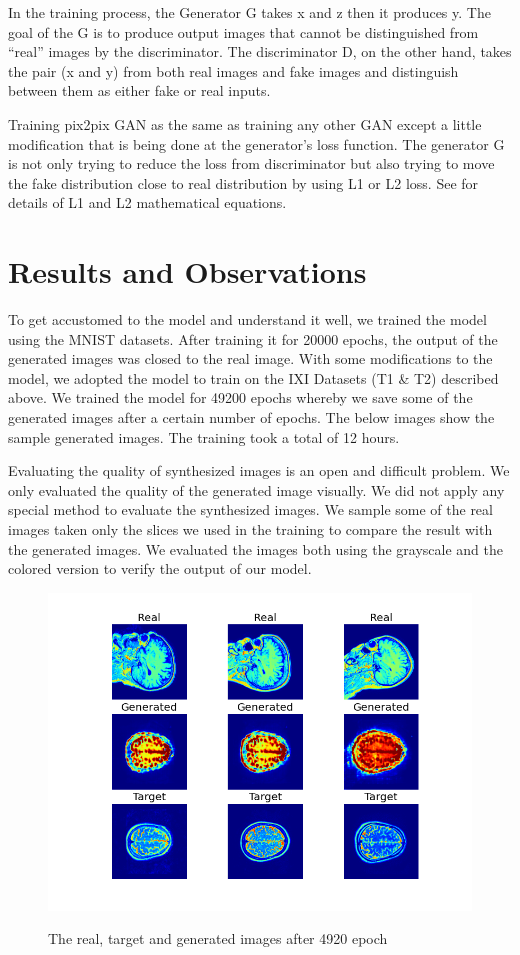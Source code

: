 \documentclass[conference]{IEEEtran}
\begin{document}
In the training process, the  Generator G takes x and z then it produces y. The goal of the G is to produce output images that cannot be distinguished from “real” images by the discriminator. The discriminator D, on the other hand, takes the pair (x and y) from both real images and fake images and distinguish between them as either fake or real inputs.

Training pix2pix GAN as the same as training any other GAN except a little modification that is being done at the generator’s loss function. The generator G is not only trying to reduce the loss from discriminator but also trying to move the fake distribution close to real distribution by using L1 or L2 loss. See \cite{isola2016imagetoimage} for details of L1 and L2 mathematical equations. 

\section{Results and Observations} %
To get accustomed to the model and understand it well, we trained the model using the MNIST datasets. After training it for 20000 epochs, the output of the generated images was closed to the real image. With some modifications to the model, we adopted the model to train on the IXI Datasets (T1 \& T2) described above. We trained the model for 49200 epochs whereby we save some of the generated images after a certain number of epochs. The below images show the sample generated images. The training took a total of 12 hours.

Evaluating the quality of synthesized images is an open and difficult problem. We only evaluated the quality of the generated image visually. We did not apply any special method to evaluate the synthesized images. We sample some of the real images taken only the slices we used in the training to compare the result with the generated images. We evaluated the images both using the grayscale and the colored version to verify the output of our model. 

\begin{figure}[H]
    \centering
    \includegraphics[width=0.95\columnwidth]{plot_004920.png}
    \label{fig:epoch4920}
    \caption{The real, target and generated images after 4920 epoch}
\end{figure}
\end{document}
